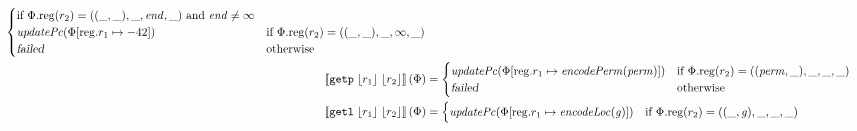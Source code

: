 \documentclass[a4paper]{article}
\newcommand{\update}[2]{[#1 \mapsto #2]}
\newcommand{\sem}[1]{\left\llbracket #1 \right\rrbracket}
\newcommand{\var}[1]{\mathit{#1}}
\newcommand{\gl}{\var{g}}
\newcommand{\addrend}{\var{end}}
\newcommand{\inftyend}{-42}
\newcommand{\perm}{\var{perm}}
\newcommand{\plainproj}[1]{\mathrm{#1}}
\newcommand{\memreg}[1][\Phi]{#1.\plainproj{reg}}
\newcommand{\updateReg}[3][\Phi]{#1\update{\plainproj{reg}.#2}{#3}}
\newcommand{\failed}{\textsl{failed}}
\newcommand{\plainfun}[2]{
  \ifthenelse{\equal{#2}{}}
  {\mathit{#1}}
  {\mathit{#1}(#2)}
}
\newcommand{\encodePerm}{\mathit{encodePerm}}
\newcommand{\encodeLoc}{\mathit{encodeLoc}{}}
\newcommand{\stdUpdatePc}[1]{\plainfun{updatePc}{#1}}
\newcommand{\refreg}[1]{\lfloor #1 \rfloor}
\newcommand{\zinstr}[1]{\mathtt{#1}}
\newcommand{\twoinstr}[3]{\zinstr{#1} \; #2 \; #3}
\newcommand{\getp}[2]{\twoinstr{getp}{#1}{#2}}
\newcommand{\getl}[2]{\twoinstr{getl}{#1}{#2}}
\begin{document}
\begin{align*}
\begin{cases}
                                              \arraycolsep=0pt
                                              \begin{array}[t]{l}
                                                \text{if $\memreg(r_2) = ((\_,\_),\_,\addrend,\_)$ and $\addrend \neq \infty$}
                                              \end{array} \\
                                              \stdUpdatePc{\updateReg{r_1}{\inftyend}} &
                                              \arraycolsep=0pt
                                              \begin{array}[t]{l}
                                                \text{if $\memreg(r_2) = ((\_,\_),\_,\infty,\_)$}
                                              \end{array} \\
                                              \failed & \text{otherwise}
                                            \end{cases}
  \\
  \sem{\getp{\refreg{r_1}}{\refreg{r_2}}}(\Phi) & = 
                                            \begin{cases}
                                              \stdUpdatePc{\updateReg{r_1}{\encodePerm(\perm)}} &
                                              \arraycolsep=0pt
                                              \begin{array}[t]{l}
                                                \text{if $\memreg(r_2) = ((\perm,\_),\_,\_,\_)$}
                                              \end{array} \\
                                              \failed & \text{otherwise}
                                            \end{cases}
  \\
  \sem{\getl{\refreg{r_1}}{\refreg{r_2}}}(\Phi) & = 
                                            \begin{cases}
                                              \stdUpdatePc{\updateReg{r_1}{\encodeLoc(\gl)}} &
                                              \arraycolsep=0pt
                                              \begin{array}[t]{l}
                                                \text{if $\memreg(r_2) = ((\_,\gl),\_,\_,\_)$}
                                              \end{array} \\

\end{cases}
\end{align*}
\end{document}
